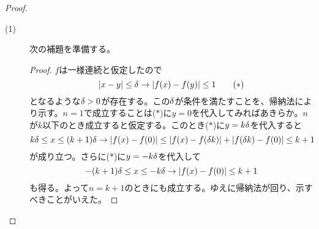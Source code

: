 \subsubsection{}%
\begin{proof} ${}$
  \begin{description}
    \item[(1)] 次の補題を準備する。

    \begin{proof}
      $f$は一様連続と仮定したので
      \[
      \left \lvert x - y  \right \rvert \leq {\delta} \to \left \lvert f(x) - f(y) \right \rvert \leq 1 \quad \quad  (*)
      \]
      となるような${\delta} > 0$が存在する。この${\delta}$が条件を満たすことを、帰納法により示す。$n=1$で成立することは($*$)に$y=0$を代入してみればあきらか。$n$が$k$以下のとき成立すると仮定する。このとき($*$)に$y = k {\delta}$を代入すると
      \[
      k {\delta}  \leq x \leq (k+1) {\delta} \to \left \lvert f(x) - f(0) \right \rvert \leq \left \lvert f(x) - f({\delta} k) \right \rvert + \left \lvert f({\delta} k) - f(0) \right \rvert \leq k+1
      \]
      が成り立つ。さらに(*)に$y = - k {\delta}$を代入して
      \[
        -(k+1) {\delta}  \leq x \leq -k {\delta} \to \left \lvert f(x) - f(0) \right \rvert  \leq k+1
      \]
      も得る。よって$n=k+1$のときにも成立する。ゆえに帰納法が回り、示すべきことがいえた。
    \end{proof}


\end{description}
\end{proof}
